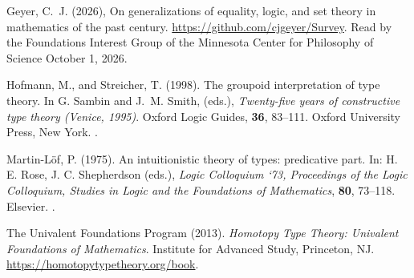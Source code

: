 \documentclass[11pt]{article}
\begin{document}
\begin{thebibliography}{}

Geyer, C.~J. (2026),
\newblock On generalizations of equality, logic, and set theory in
    mathematics of the past century.
\newblock \url{https://github.com/cjgeyer/Survey}.
\newblock Read by the Foundations Interest Group of the Minnesota Center
    for Philosophy of Science October 1, 2026.

Hofmann, M., and Streicher, T. (1998).
\newblock The groupoid interpretation of type theory.
\newblock In G. Sambin and J.~M. Smith, (eds.),
    \emph{Twenty-five years of constructive type theory (Venice, 1995)}.
\newblock Oxford Logic Guides, \textbf{36}, 83--111.
\newblock Oxford University Press, New York.
\newblock {}.

Martin-L\"{o}f, P. (1975).
\newblock An intuitionistic theory of types: predicative part.
\newblock In: H. E. Rose, J. C. Shepherdson (eds.),
    \emph{Logic Colloquium ‘73, Proceedings of the Logic Colloquium,
    Studies in Logic and the Foundations of Mathematics}, \textbf{80}, 73--118.
\newblock Elsevier.
\newblock {}.

The Univalent Foundations Program (2013).
\newblock \emph{Homotopy Type Theory: Univalent Foundations of Mathematics}.
\newblock Institute for Advanced Study, Princeton, NJ.
\newblock \url{https://homotopytypetheory.org/book}.

\end{thebibliography}
\end{document}
